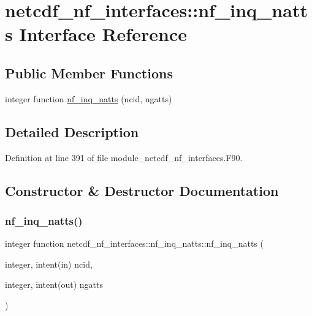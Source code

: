 \hypertarget{interfacenetcdf__nf__interfaces_1_1nf__inq__natts}{}\section{netcdf\+\_\+nf\+\_\+interfaces\+:\+:nf\+\_\+inq\+\_\+natts Interface Reference}
\label{interfacenetcdf__nf__interfaces_1_1nf__inq__natts}
\subsection*{Public Member Functions}
\begin{DoxyCompactItemize}
\item 
integer function \hyperlink{interfacenetcdf__nf__interfaces_1_1nf__inq__natts_a70b73a592dade9734587f2f1ad3626af}{nf\+\_\+inq\+\_\+natts} (ncid, ngatts)
\end{DoxyCompactItemize}


\subsection{Detailed Description}


Definition at line 391 of file module\+\_\+netcdf\+\_\+nf\+\_\+interfaces.\+F90.



\subsection{Constructor \& Destructor Documentation}
\mbox{\label{interfacenetcdf__nf__interfaces_1_1nf__inq__natts_a70b73a592dade9734587f2f1ad3626af}} 
\subsubsection{\texorpdfstring{nf\+\_\+inq\+\_\+natts()}{nf\_inq\_natts()}}
{\footnotesize\ttfamily integer function netcdf\+\_\+nf\+\_\+interfaces\+::nf\+\_\+inq\+\_\+natts\+::nf\+\_\+inq\+\_\+natts (\begin{DoxyParamCaption}\item[{integer, intent(in)}]{ncid,  }\item[{integer, intent(out)}]{ngatts }\end{DoxyParamCaption})}




